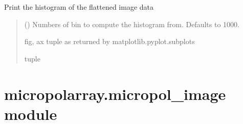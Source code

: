 \documentclass[letterpaper,10pt,english]{sphinxmanual}
\begin{document}
\begin{fulllineitems}
\begin{fulllineitems}
\label{\detokenize{micropolarray:micropolarray.image.Image.show_histogram}}
\pysigstartsignatures
{}
\pysigstopsignatures
\sphinxAtStartPar
Print the histogram of the flattened image data
\begin{quote}\begin{description}
\sphinxAtStartPar
{} (\sphinxstyleliteralemphasis{\sphinxupquote{, }}) \textendash{} Numbers of bin to compute the histogram from. Defaults to 1000.

\sphinxAtStartPar
fig, ax tuple as returned by matplotlib.pyplot.subplots

\sphinxAtStartPar
tuple

\end{description}\end{quote}

\end{fulllineitems}


\end{fulllineitems}



\section{micropolarray.micropol\_image module}
\label{\detokenize{micropolarray:module-micropolarray.micropol_image}}\label{\detokenize{micropolarray:micropolarray-micropol-image-module}}
\end{document}
